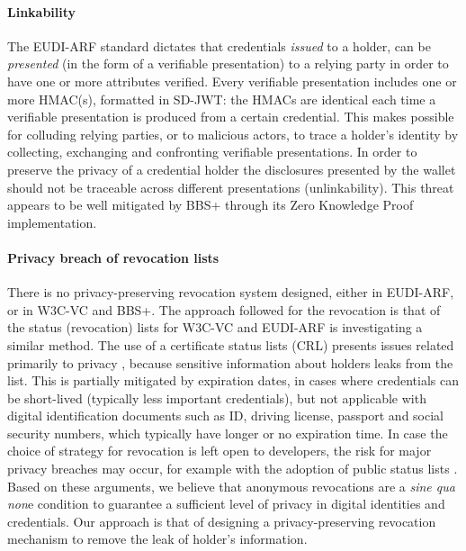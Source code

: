 \paragraph{Linkability}

The EUDI-ARF standard dictates that credentials \textit{issued} to a holder, can be \textit{presented} (in the form of a verifiable presentation) to a relying party in order to have one or more attributes verified. Every verifiable presentation includes one or more HMAC(s), formatted in SD-JWT: the HMACs are identical each time a verifiable presentation is produced from a certain credential. This makes possible for colluding relying parties, or to malicious actors, to trace a holder's identity by collecting, exchanging and confronting verifiable presentations. In order to preserve the privacy of a credential holder the disclosures presented by the wallet should not be traceable across different presentations (unlinkability). This threat appears to be well mitigated by BBS+ through its Zero Knowledge Proof implementation.

\paragraph{Privacy breach of revocation lists}

There is no privacy-preserving revocation system designed, either in EUDI-ARF, or in W3C-VC and BBS+. The approach followed for the revocation is that of the status (revocation) lists \cite{status-lists} for W3C-VC and EUDI-ARF is investigating a similar method. The use of a certificate status lists (CRL) presents issues related primarily to privacy \cite{CRL}, because sensitive information about holders leaks from the list. This is partially mitigated by expiration dates, in cases where credentials can be short-lived (typically less important credentials), but not applicable with digital identification documents such as ID, driving license, passport and social security numbers, which typically have longer or no expiration time. In case the choice of strategy for revocation is left open to developers, the risk for major privacy breaches may occur, for example with the adoption of public status lists \cite{crlcomparison}. Based on these arguments, we believe that anonymous revocations are a \textit{sine qua non}e condition to guarantee a sufficient level of privacy in digital identities and credentials. Our approach is that of designing a privacy-preserving revocation mechanism to remove the leak of holder's information.

